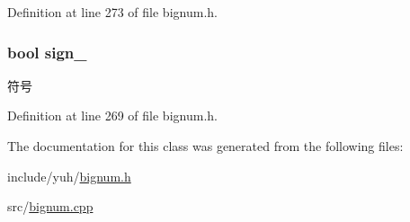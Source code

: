 \-Definition at line 273 of file bignum.\-h.

\hypertarget{classyuh_1_1bignum_abf0bf01a903f906b194bf9f01ff2aab8}{
\subsubsection[{sign\-\_\-}]{\setlength{\rightskip}{0pt plus 5cm}bool {\bf sign\-\_\-}}}\label{d7/d6b/classyuh_1_1bignum_abf0bf01a903f906b194bf9f01ff2aab8}
符号 

\-Definition at line 269 of file bignum.\-h.



\-The documentation for this class was generated from the following files\-:\begin{DoxyCompactItemize}
\item 
include/yuh/\hyperlink{bignum_8h}{bignum.\-h}\item 
src/\hyperlink{bignum_8cpp}{bignum.\-cpp}\end{DoxyCompactItemize}
